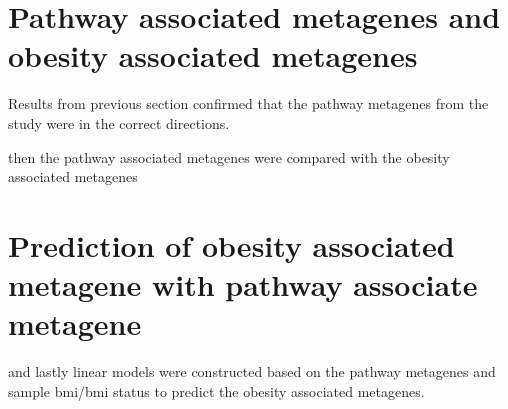 \section{Pathway associated metagenes and obesity associated metagenes}
\label{sec:pathway_associated_metagenes_and_obesity_associated_metagenes}

Results from previous section confirmed that the pathway metagenes from the \citet{Gatza2010a} study were in the correct directions.




then the pathway associated metagenes were compared with the obesity associated metagenes







\section{Prediction of obesity associated metagene with pathway associate metagene}
\label{sec:prediction_of_obesity_associated_metagene_with_pathway_associate_metagene}

and lastly linear models were constructed based on the pathway metagenes and sample \gls{bmi}/\gls{bmi} status to predict the obesity associated metagenes.





